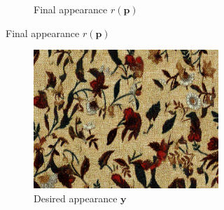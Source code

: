 \begin{figure}[]
\begin{subfigure}{\textwidth}
\begin{subfigure}{0.78\textwidth}
\begin{subfigure}{0.32\textwidth}
            \end{subfigure}
            \caption*{Final appearance \(r(\bm{p})\)}
        \end{subfigure}
    \end{subfigure}

    \begin{subfigure}{\textwidth}
        \centering
        \begin{subfigure}{0.2\textwidth}
            \centering
            \includegraphics[width=\textwidth]{images/04-experiment02/sofa/flowers2/target.jpg}
            \caption*{Desired appearance \(\bm{y}\)}
        \end{subfigure}
        \hfill
        \begin{subfigure}{0.78\textwidth}
            \centering
            \begin{subfigure}{0.32\textwidth}
                \centering
                \begin{tikzpicture}

\end{tikzpicture}
\end{subfigure}
\end{subfigure}
\end{subfigure}
\end{figure}
